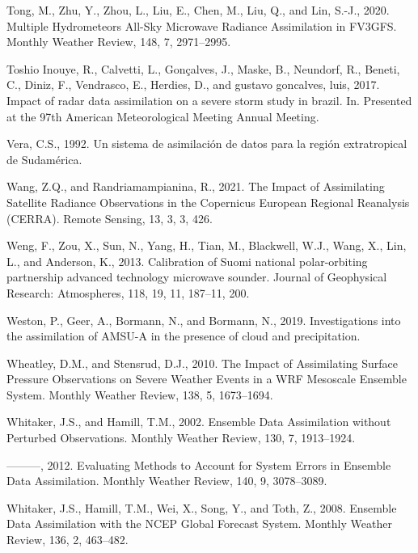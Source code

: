 \documentclass[12pt,oneside]{reedthesis}
\begin{document}
\leavevmode\hypertarget{ref-tong2020}{}%
Tong, M., Zhu, Y., Zhou, L., Liu, E., Chen, M., Liu, Q., and Lin, S.-J., 2020. Multiple Hydrometeors All-Sky Microwave Radiance Assimilation in FV3GFS. Monthly Weather Review, 148, 7, 2971--2995.

\leavevmode\hypertarget{ref-toshioinouye2017}{}%
Toshio Inouye, R., Calvetti, L., Gonçalves, J., Maske, B., Neundorf, R., Beneti, C., Diniz, F., Vendrasco, E., Herdies, D., and gustavo goncalves, luis, 2017. Impact of radar data assimilation on a severe storm study in brazil. In. Presented at the 97th American Meteorological Meeting Annual Meeting.

\leavevmode\hypertarget{ref-vera1992}{}%
Vera, C.S., 1992. Un sistema de asimilación de datos para la región extratropical de Sudamérica.

\leavevmode\hypertarget{ref-wang2021}{}%
Wang, Z.Q., and Randriamampianina, R., 2021. The Impact of Assimilating Satellite Radiance Observations in the Copernicus European Regional Reanalysis (CERRA). Remote Sensing, 13, 3, 3, 426.

\leavevmode\hypertarget{ref-weng2013}{}%
Weng, F., Zou, X., Sun, N., Yang, H., Tian, M., Blackwell, W.J., Wang, X., Lin, L., and Anderson, K., 2013. Calibration of Suomi national polar-orbiting partnership advanced technology microwave sounder. Journal of Geophysical Research: Atmospheres, 118, 19, 11, 187--11, 200.

\leavevmode\hypertarget{ref-weston2019}{}%
Weston, P., Geer, A., Bormann, N., and Bormann, N., 2019. Investigations into the assimilation of AMSU-A in the presence of cloud and precipitation.

\leavevmode\hypertarget{ref-wheatley2010}{}%
Wheatley, D.M., and Stensrud, D.J., 2010. The Impact of Assimilating Surface Pressure Observations on Severe Weather Events in a WRF Mesoscale Ensemble System. Monthly Weather Review, 138, 5, 1673--1694.

\leavevmode\hypertarget{ref-whitaker2002}{}%
Whitaker, J.S., and Hamill, T.M., 2002. Ensemble Data Assimilation without Perturbed Observations. Monthly Weather Review, 130, 7, 1913--1924.

\leavevmode\hypertarget{ref-whitaker2012}{}%
---------, 2012. Evaluating Methods to Account for System Errors in Ensemble Data Assimilation. Monthly Weather Review, 140, 9, 3078--3089.

\leavevmode\hypertarget{ref-whitaker2008}{}%
Whitaker, J.S., Hamill, T.M., Wei, X., Song, Y., and Toth, Z., 2008. Ensemble Data Assimilation with the NCEP Global Forecast System. Monthly Weather Review, 136, 2, 463--482.
\end{document}
